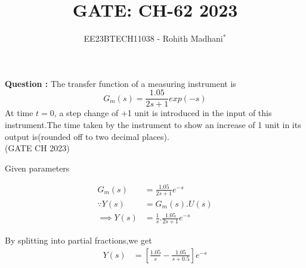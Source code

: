 \documentclass[journal,12pt,twocolumn]{IEEEtran}
\theoremstyle{remark}
\begin{document}

\vspace{3cm}

\title{GATE: CH-62 2023}
\author{EE23BTECH11038 - Rohith Madhani$^{*}$%
}
\maketitle
\newpage
\bigskip
\renewcommand{\thefigure}{\theenumi}
\renewcommand{\thetable}{\theenumi}

\textbf{Question :} The transfer function of a measuring instrument is \\
$$G_m(s) = \frac{1.05}{2s+1}exp(-s)$$
At time $t = 0$, a step change of +1 unit is introduced in the input of this instrument.The time taken by the instrument to show an increase of 1 unit in its output is(rounded off to two decimal places). \\ \hfill(GATE CH 2023) \\
\solution

\begin{table}[!h] 
\centering

\caption{Given parameters}
\label{table:gate23ch62}
\end{table}


\begin{align}
    G_m(s) &= \frac{1.05}{2s+1}e^{-s} \\
    \because Y(s) &= G_m(s).U(s) \\
    \implies Y(s) &= \frac{1}{s}.\frac{1.05}{2s+1}e^{-s}
\end{align}

By splitting into partial fractions,we get
\begin{align}
    Y(s) &= [\frac{1.05}{s} - \frac{1.05}{s+0.5}]e^{-s}
\end{align}
\end{document}
